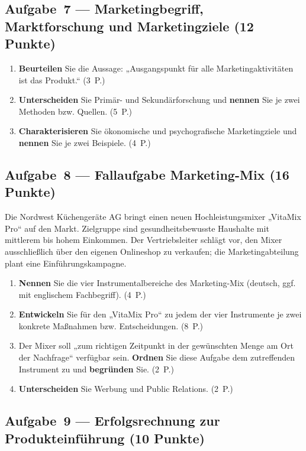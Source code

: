 \documentclass[11pt, a4paper]{article}
\begin{document}
\subsection*{Aufgabe~7 --- Marketingbegriff, Marktforschung und Marketingziele (12 Punkte)}

\begin{enumerate}[label=(\alph*)]
  \item \textbf{Beurteilen} Sie die Aussage: „Ausgangspunkt für alle Marketingaktivitäten ist das Produkt.`` \hfill (3~P.)
  \item \textbf{Unterscheiden} Sie Primär- und Sekundärforschung und \textbf{nennen} Sie je zwei Methoden bzw. Quellen. \hfill (5~P.)
  \item \textbf{Charakterisieren} Sie ökonomische und psychografische Marketingziele und \textbf{nennen} Sie je zwei Beispiele. \hfill (4~P.)
\end{enumerate}

\subsection*{Aufgabe~8 --- Fallaufgabe Marketing-Mix (16 Punkte)}

Die Nordwest Küchengeräte AG bringt einen neuen Hochleistungsmixer „VitaMix Pro`` auf
den Markt. Zielgruppe sind gesundheitsbewusste Haushalte mit mittlerem bis hohem
Einkommen. Der Vertriebsleiter schlägt vor, den Mixer ausschließlich über den eigenen
Onlineshop zu verkaufen; die Marketingabteilung plant eine Einführungskampagne.

\begin{enumerate}[label=(\alph*)]
  \item \textbf{Nennen} Sie die vier Instrumentalbereiche des Marketing-Mix (deutsch, ggf. mit englischem Fachbegriff). \hfill (4~P.)
  \item \textbf{Entwickeln} Sie für den „VitaMix Pro`` zu jedem der vier Instrumente je zwei konkrete Maßnahmen bzw. Entscheidungen. \hfill (8~P.)
  \item Der Mixer soll „zum richtigen Zeitpunkt in der gewünschten Menge am Ort der Nachfrage`` verfügbar sein. \textbf{Ordnen} Sie diese Aufgabe dem zutreffenden Instrument zu und \textbf{begründen} Sie. \hfill (2~P.)
  \item \textbf{Unterscheiden} Sie Werbung und Public Relations. \hfill (2~P.)
\end{enumerate}

\subsection*{Aufgabe~9 --- Erfolgsrechnung zur Produkteinführung (10 Punkte)}
\end{document}

